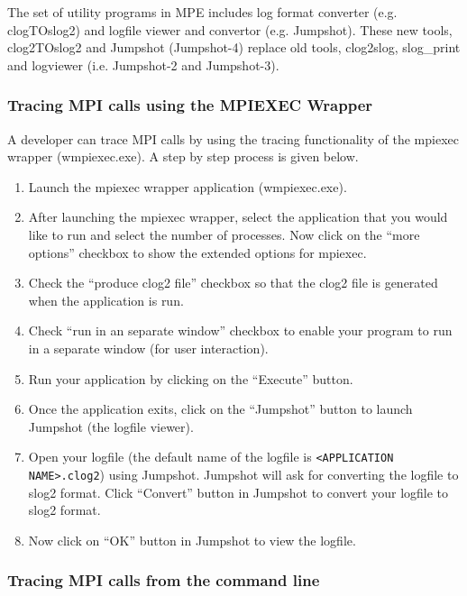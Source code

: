 \documentclass[dvipdfm,11pt]{article}
\begin{document}
The set of utility programs in MPE includes log format converter (e.g.
clogTOslog2) and logfile viewer and convertor (e.g. Jumpshot).  These new 
tools, clog2TOslog2 and Jumpshot (Jumpshot-4) replace old tools, clog2slog, 
slog\_print and logviewer (i.e. Jumpshot-2 and Jumpshot-3).  

\subsubsection{Tracing MPI calls using the MPIEXEC Wrapper}
A developer can trace MPI calls by using the tracing functionality of the mpiexec
wrapper (wmpiexec.exe). A step by step process is given below. 

\begin{enumerate}
	\item Launch the mpiexec wrapper application (wmpiexec.exe).
	
	\item After launching the mpiexec wrapper, select the application that you would
			like to run and select the number of
			processes. Now click on the ``more options''
			checkbox to show the extended options for mpiexec.

	\item Check the ``produce clog2 file'' checkbox so that the clog2 file is generated 
			when the application is run.

	\item Check ``run in an separate window'' checkbox to enable your program to run in
			a separate window (for user interaction).

	\item Run your application by clicking on the ``Execute'' button.
	
	\item Once the application exits, click on the ``Jumpshot'' button to launch Jumpshot 
			(the logfile viewer). 

	\item Open your logfile (the default name of the logfile is \texttt{<APPLICATION NAME>.clog2}) 
			using Jumpshot. Jumpshot will ask for converting the logfile to slog2 format.
			Click ``Convert'' button in Jumpshot to convert your logfile to slog2 format.

	\item Now click on ``OK'' button in Jumpshot to view the logfile.
\end{enumerate}

\subsubsection{Tracing MPI calls from the command line}
\end{document}
